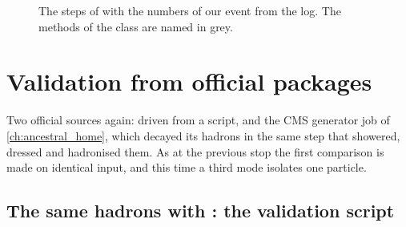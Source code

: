 \begin{figure}[htbp]\centering
\resizebox{\textwidth}{!}{}
\caption[The hadron-decay stage as a flow chart]{The steps of
 with the numbers of our event from the
 log. The methods of the  class are named in grey.}
\label{fig:children_producing_grandchildren:flow}
\end{figure}

\section{Validation from official packages}
\label{sec:children_producing_grandchildren:validation}

Two official sources again: \PYTHIA driven from a script, and the CMS
generator job of \cref{ch:ancestral_home}, which decayed its hadrons in
the same step that showered, dressed and hadronised them. As at the
previous stop the first comparison is made on identical input, and this
time a third mode isolates one particle.

\subsection{The same hadrons with \PYTHIA: the validation script}
\label{sec:children_producing_grandchildren:pythia}

